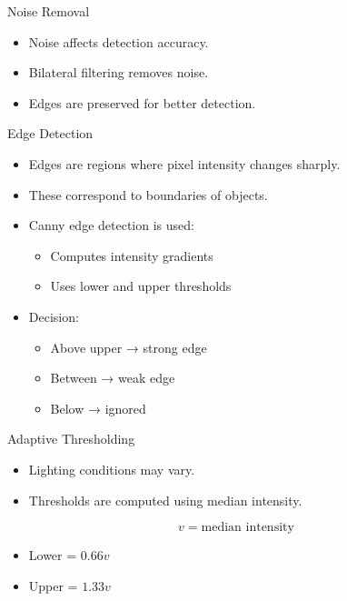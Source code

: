 \documentclass{beamer}
\begin{document}
\begin{frame}{Noise Removal}
\begin{itemize}
\item Noise affects detection accuracy.
\item Bilateral filtering removes noise.
\item Edges are preserved for better detection.
\end{itemize}
\end{frame}

\begin{frame}{Edge Detection}
\begin{itemize}
\item Edges are regions where pixel intensity changes sharply.
\item These correspond to boundaries of objects.

\item Canny edge detection is used:
\begin{itemize}
\item Computes intensity gradients
\item Uses lower and upper thresholds
\end{itemize}

\item Decision:
\begin{itemize}
\item Above upper → strong edge
\item Between → weak edge
\item Below → ignored
\end{itemize}
\end{itemize}
\end{frame}

\begin{frame}{Adaptive Thresholding}
\begin{itemize}
\item Lighting conditions may vary.
\item Thresholds are computed using median intensity.
\end{itemize}

\[
v = \text{median intensity}
\]

\begin{itemize}
\item Lower = $0.66v$
\item Upper = $1.33v$
\end{itemize}
\end{frame}
\end{document}
